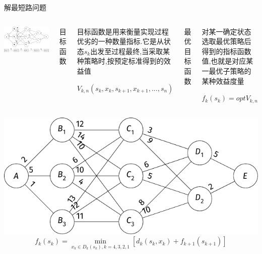 \begin{frame}{解最短路问题}
    \begin{columns}
        \includegraphics[scale=.65]{fig/4-1.pdf}
            \begin{enumerate}[(6)]
                \scriptsize{\item 目标函数}
            \end{enumerate}
            \begin{itemize}
                \scriptsize{\item 目标函数是用来衡量实现过程优劣的一种数量指标.它是从状态$s_k$出发至过程最终,当采取某种策略时,按预定标准得到的效益值}
                \item $V_{k,n}(s_k,x_k,s_{k+1},x_{k+1},...,s_n)$
            \end{itemize}
            \pause
            \begin{enumerate}[(7)]
                \scriptsize{\item 最优目标函数}
            \end{enumerate}
            \begin{itemize}
                \scriptsize{\item 对某一确定状态选取最优策略后得到的指标函数值,也就是对应某一最优子策略的某种效益度量}
                \item $f_k(s_k)=optV_{k,n}$
            \end{itemize}
    \end{columns}
\end{frame}
\begin{frame}
    \includegraphics{fig/4-2-1.pdf}
    \vfill
    $$f_k(s_k)=\min \limits_{x_k\in D_k(s_k),k=4,3,2,1} [d_k(s_k,x_k)+f_{k+1}(s_{k+1})]$$
\end{frame}
